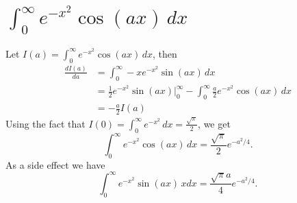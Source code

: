 \section{ $ \int_0^{\infty} e^{-x^2} \cos(a x) \, dx $ }
Let $ I(a) = \int_0^{\infty} e^{-x^2} \cos(a x) \, dx $, then
\begin{align*}
  \frac{dI(a)}{da} &= \int_0^{\infty} - x e^{-x^2} \sin(a x) \, dx  \\
                   &= \frac{1}{2} e^{-x^2} \sin(a x) \vert_0^{\infty}
                      - \int_0^{\infty} \frac{a}{2} e^{-x^2} \cos(a x) \, dx  \\
                   &= - \frac{a}{2} I(a)
\end{align*}
Using the fact that 
$I(0) = \int_0^{\infty} e^{-x^2} \, dx = \frac{\sqrt{\pi}}{2} $, 
we get
\begin{equation} \label{E:int2}
  \int_0^{\infty} e^{-x^2} \cos(a x) \, dx = \frac{\sqrt{\pi}}{2} e^{-a^2 /4}.
\end{equation}
As a side effect we have
\begin{equation} \label{E:int2_2}
  \int_0^{\infty} e^{-x^2} \sin(a x) \, x dx = \frac{\sqrt{\pi}a}{4} e^{-a^2 /4}.
\end{equation}

